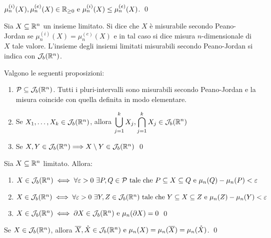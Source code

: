 \begin{lemma}
    $\mu_n^{(i)}(X), \mu_n^{(e)}(X) \in \mathbb{R}_{\geq 0} \text{ e } \mu_n^{(i)}(X)\leq\mu_n^{(e)}(X)$.
    \qed
\end{lemma}

\begin{definition}
    Sia $X \subseteq \mathbb{R}^n$ un insieme limitato. Si dice che $X$ è misurabile secondo Peano-Jordan se $\mu_n^{(i)}(X)=\mu_n^{(e)}(X)$ e in tal caso si dice misura $n$-dimensionale di $X$ tale valore.
    L'insieme degli insiemi limitati misurabili secondo Peano-Jordan si indica con $\mathcal{J}_b(\mathbb{R}^n)$.
\end{definition}

\begin{lemma} Valgono le seguenti proposizioni:
    \begin{enumerate}
        \item $\mathcal{P} \subseteq \mathcal{J}_b(\mathbb{R}^n)$. Tutti i pluri-intervalli sono misurabili secondo Peano-Jordan e la misura coincide con quella definita in modo elementare.
        \item Se $X_1,\dots,X_k \in \mathcal{J}_b(\mathbb{R}^n)$, allora $\displaystyle\bigcup_{j=1}^k X_j, \bigcap_{j=1}^kX_j \in \mathcal{J}_b(\mathbb{R}^n)$
        \item Se $X,Y \in \mathcal{J}_b(\mathbb{R}^n)\Longrightarrow X \setminus Y \in \mathcal{J}_b(\mathbb{R}^n)$
        \qed
    \end{enumerate}
\end{lemma}

\begin{theorem}
    Sia $X\subseteq \mathbb{R}^n$ limitato. Allora:
    \begin{enumerate}
        \item $X\in \mathcal{J}_b(\mathbb{R}^n) \iff \forall \varepsilon > 0 \ \exists P,Q \in \mathcal{P} \text{ tale che } P \subseteq X \subseteq Q \text{ e } \mu_n(Q)-\mu_n(P) < \varepsilon$
        \item $X \in \mathcal{J}_b(\mathbb{R}^n) \iff \forall \varepsilon > 0 \ \exists Y,Z \in \mathcal{J}_b(\mathbb{R}^n) \text{ tale che } Y \subseteq X \subseteq Z \text{ e } \mu_n(Z)-\mu_n(Y) < \varepsilon$
        \item $X \in \mathcal{J}_b(\mathbb{R}^n)\iff \partial X \in \mathcal{J}_b(\mathbb{R}^n) \text{ e } \mu_n(\partial X)=0$
        \qed
    \end{enumerate}
\end{theorem}

\begin{corollary}
    Se $X \in \mathcal{J}_b(\mathbb{R}^n)$, allora $\overline{X},\mathring X \in \mathcal{J}_b(\mathbb{R}^n) \text{ e } \mu_n(X)=\mu_n(\overline{X})=\mu_n(\mathring X)$.
    \qed
\end{corollary}

